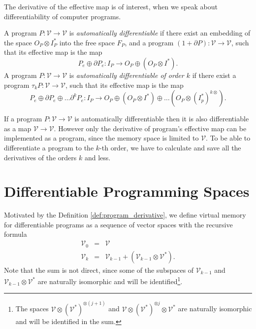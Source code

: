\documentclass[11pt]{article}
\newcommand{\VV}{\mathcal{V}}
\newcommand{\D}{\partial}
\newcommand{\sumd}{\tau}
\begin{document}
The derivative of the effective map is of interest, when we speak about
differentiability of computer programs. 
\begin{definition}
  \label{def:program_derivative}
  A program $P:\VV\to \VV$ is \emph{automatically differentiable} if there exist
  an embedding of the space $O_P\otimes I_P^*$ into the free space $F_P$, and a program $(1+\D P):\VV\to \VV$,
  such that its effective map is the map
  \begin{equation}
    \label{eq:program_derivative}
    P_e\oplus \D P_e:I_P\rightarrow O_P\oplus (O_P\otimes I^*).
  \end{equation}
  A program $P:\VV\to \VV$ is \emph{automatically differentiable of order $k$}
  if there exist a program $\sumd_k P:\VV\to \VV$,
  such that its effective map is the map
  \begin{equation}
    \label{eq:program_derivative_higher}
    P_e\oplus \D P_e\oplus \ldots \D^k P_e:I_P\rightarrow O_P\oplus \left(O_P\otimes I^*\right)\oplus\ldots \left( O_P\otimes \left( I_p^*\right)^{k\otimes} \right).
  \end{equation}
\end{definition}

If a program $P:\VV\to \VV$ is automatically differentiable then it is also
differentiable as a map $\VV\to\VV$. However only the derivative of program's
effective map can be implemented as a program, since the memory space is limited to $\VV$. 
To be able to differentiate a program to the $k$-th order, we have to calculate
and save all the derivatives of the orders $k$ and less.
\section{Differentiable Programming Spaces}
Motivated by the Definition
\ref{def:program_derivative}, we define
virtual memory for differentiable programs  as a sequence of vector spaces with
the recursive formula
\begin{eqnarray}
  \VV_0 &=& \VV\\
  \label{eq:universal_space}
  \VV_k &=& \VV_{k-1}+\left(\VV_{k-1}\otimes \VV^*\right).
\end{eqnarray}
Note that the sum is not direct, since some of the subspaces of $\VV_{k-1}$ and
$\VV_{k-1}\otimes \VV^*$ are naturally isomorphic and will be
identified\footnote{The spaces $\VV\otimes(\VV^*)^{\otimes (j+1)}$ and
  $\VV\otimes (\VV^*)^{\otimes j}\otimes \VV^*$ are naturally isomorphic and
  will be identified in the sum.
}.
\end{document}
